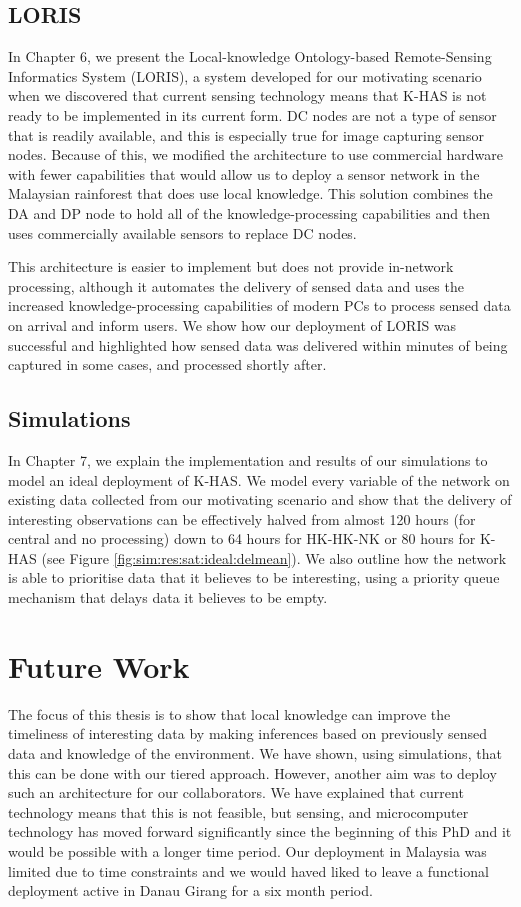\subsection{LORIS}
In Chapter 6, we present the Local-knowledge Ontology-based Remote-Sensing Informatics System (LORIS), a system developed for our motivating scenario when we discovered that current sensing technology means that K-HAS is not ready to be implemented in its current form. DC nodes are not a type of sensor that is readily available, and this is especially true for image capturing sensor nodes. Because of this, we modified the architecture to use commercial hardware with fewer capabilities that would allow us to deploy a sensor network in the Malaysian rainforest that does use local knowledge. This solution combines the DA and DP node to hold all of the knowledge-processing capabilities and then uses commercially available sensors to replace DC nodes. 

This architecture is easier to implement but does not provide in-network processing, although it automates the delivery of sensed data and uses the increased knowledge-processing capabilities of modern PCs to process sensed data on arrival and inform users. We show how our deployment of LORIS was successful and highlighted how sensed data was delivered within minutes of being captured in some cases, and processed shortly after. 
\subsection{Simulations}
In Chapter 7, we explain the implementation and results of our simulations to model an ideal deployment of K-HAS. We model every variable of the network on existing data collected from our motivating scenario and show that the delivery of interesting observations can be effectively halved from almost 120 hours (for central and no processing) down to 64 hours for HK-HK-NK or 80 hours for K-HAS (see Figure \ref{fig:sim:res:sat:ideal:delmean}).
We also outline how the network is able to prioritise data that it believes to be interesting, using a priority queue mechanism that delays data it believes to be empty. 

\section{Future Work}
The focus of this thesis is to show that local knowledge can improve the timeliness of interesting data by making inferences based on previously sensed data and knowledge of the environment. We have shown, using simulations, that this can be done with our tiered approach. However, another aim was to deploy such an architecture for our collaborators. We have explained that current technology means that this is not feasible, but sensing, and microcomputer technology has moved forward significantly since the beginning of this PhD and it would be possible with a longer time period. Our deployment in Malaysia was limited due to time constraints and we would haved liked to leave a functional deployment active in Danau Girang for a six month period. 

